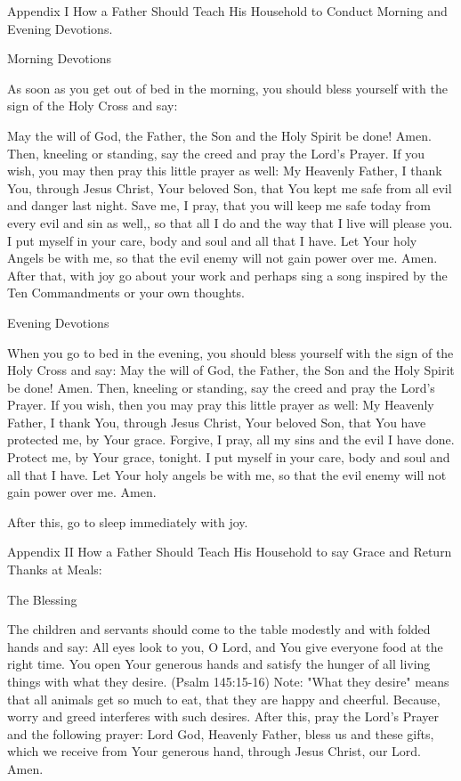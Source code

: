 Appendix I
How a Father Should Teach His Household
to Conduct Morning and Evening Devotions.

Morning Devotions

As soon as you get out of bed in the morning, you should bless yourself
with the sign of the Holy Cross and say:

May the will of God, the Father, the Son and the Holy Spirit be done!
Amen.
Then, kneeling or standing, say the creed and pray the Lord's Prayer.
If you wish, you may then pray this little prayer as well:
My Heavenly Father, I thank You, through Jesus Christ, Your beloved
Son, that You kept me safe from all evil and danger last night. Save
me, I pray, that you will keep me safe today from every evil and sin as
well,, so that all I do and the way that I live will please you. I put
myself in your care, body and soul and all that I have. Let Your holy
Angels be with me, so that the evil enemy will not gain power over me.
Amen.
After that, with joy go about your work and perhaps sing a song
inspired by the Ten Commandments or your own thoughts.

Evening Devotions

When you go to bed in the evening, you should bless yourself with the
sign of the Holy Cross and say:
May the will of God, the Father, the Son and the Holy Spirit be done!
Amen.
Then, kneeling or standing, say the creed and pray the Lord's Prayer.
If you wish, then you may pray this little prayer as well:
My Heavenly Father, I thank You, through Jesus Christ, Your beloved
Son, that You have protected me, by Your grace. Forgive, I pray, all my
sins and the evil I have done. Protect me, by Your grace, tonight. I
put myself in your care, body and soul and all that I have. Let Your
holy angels be with me, so that the evil enemy will not gain power over
me. Amen.

After this, go to sleep immediately with joy.

Appendix II
How a Father Should Teach His Household
to say Grace and Return Thanks at Meals:

The Blessing

The children and servants should come to the table modestly and with
folded hands and say:
All eyes look to you, O Lord, and You give everyone food at the right
time. You open Your generous hands and satisfy the hunger of all living
things with what they desire. (Psalm 145:15-16)
Note: "What they desire" means that all animals get so much to eat,
that they are happy and cheerful. Because, worry and greed interferes
with such desires.
After this, pray the Lord's Prayer and the following prayer:
Lord God, Heavenly Father, bless us and these gifts, which we receive
from Your generous hand, through Jesus Christ, our Lord. Amen.

